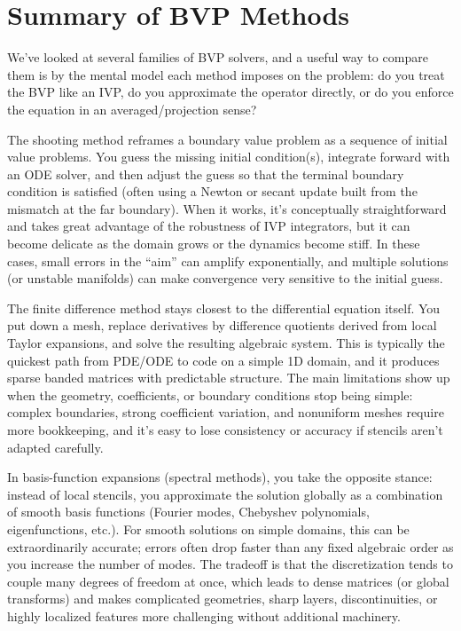 \section{Summary of BVP Methods}

We've looked at several families of BVP solvers, and a useful way to compare them is by the mental model each method imposes on the problem: do you treat the BVP like an IVP, do you approximate the operator directly, or do you enforce the equation in an averaged/projection sense?

The shooting method reframes a boundary value problem as a sequence of initial value problems. You guess the missing initial condition(s), integrate forward with an ODE solver, and then adjust the guess so that the terminal boundary condition is satisfied (often using a Newton or secant update built from the mismatch at the far boundary). When it works, it's conceptually straightforward and takes great advantage of the robustness of IVP integrators, but it can become delicate as the domain grows or the dynamics become stiff. In these cases, small errors in the ``aim'' can amplify exponentially, and multiple solutions (or unstable manifolds) can make convergence very sensitive to the initial guess.

The finite difference method stays closest to the differential equation itself. You put down a mesh, replace derivatives by difference quotients derived from local Taylor expansions, and solve the resulting algebraic system. This is typically the quickest path from PDE/ODE to code on a simple 1D domain, and it produces sparse banded matrices with predictable structure. The main limitations show up when the geometry, coefficients, or boundary conditions stop being simple: complex boundaries, strong coefficient variation, and nonuniform meshes require more bookkeeping, and it's easy to lose consistency or accuracy if stencils aren't adapted carefully.

In basis-function expansions (spectral methods), you take the opposite stance: instead of local stencils, you approximate the solution globally as a combination of smooth basis functions (Fourier modes, Chebyshev polynomials, eigenfunctions, etc.). For smooth solutions on simple domains, this can be extraordinarily accurate; errors often drop faster than any fixed algebraic order as you increase the number of modes. The tradeoff is that the discretization tends to couple many degrees of freedom at once, which leads to dense matrices (or global transforms) and makes complicated geometries, sharp layers, discontinuities, or highly localized features more challenging without additional machinery.

